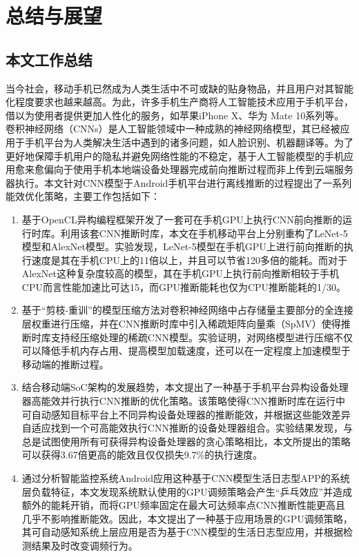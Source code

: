 \chapter{总结与展望}
\label{chapter:chapter6}
\section{本文工作总结}
当今社会，移动手机已然成为人类生活中不可或缺的贴身物品，并且用户对其智能化程度要求也越来越高。为此，许多手机生产商将人工智能技术应用于手机平台，借以为使用者提供更加人性化的服务，如苹果iPhone X、华为 Mate 10系列等。卷积神经网络（CNNs）是人工智能领域中一种成熟的神经网络模型，其已经被应用于手机平台为人类解决生活中遇到的诸多问题，如人脸识别、机器翻译等。为了更好地保障手机用户的隐私并避免网络性能的不稳定，基于人工智能模型的手机应用愈来愈偏向于使用手机本地端设备处理器完成前向推断过程而非上传到云端服务器执行。本文针对CNN模型于Android手机平台进行离线推断的过程提出了一系列能效优化策略，主要工作包括如下：
\begin{enumerate}
  \item 基于OpenCL异构编程框架开发了一套可在手机GPU上执行CNN前向推断的运行时库。利用该套CNN推断时库，本文在手机移动平台上分别重构了LeNet-5模型和AlexNet模型。实验发现，LeNet-5模型在手机GPU上进行前向推断的执行速度是其在手机CPU上的11倍以上，并且可以节省120多倍的能耗。而对于AlexNet这种复杂度较高的模型，其在手机GPU上执行前向推断相较于手机CPU而言性能加速比可达15，而GPU推断能耗也仅为CPU推断能耗的1/30。
  \item 基于“剪枝-重训”的模型压缩方法对卷积神经网络中占存储量主要部分的全连接层权重进行压缩，并在CNN推断时库中引入稀疏矩阵向量乘（SpMV）使得推断时库支持经压缩处理的稀疏CNN模型。实验证明，对网络模型进行压缩不仅可以降低手机内存占用、提高模型加载速度，还可以在一定程度上加速模型于移动端的推断过程。
  \item 结合移动端SoC架构的发展趋势，本文提出了一种基于手机平台异构设备处理器高能效并行执行CNN推断的优化策略。该策略使得CNN推断时库在运行中可自动感知目标平台上不同异构设备处理器的推断能效，并根据这些能效差异自适应找到一个可高能效执行CNN推断的设备处理器组合。实验结果发现，与总是试图使用所有可获得异构设备处理器的贪心策略相比，本文所提出的策略可以获得3.67倍更高的能效且仅仅损失9.7\%的执行速度。
  \item 通过分析智能监控系统Android应用这种基于CNN模型生活日志型APP的系统层负载特征，本文发现系统默认使用的GPU调频策略会产生“乒乓效应”并造成额外的能耗开销，而将GPU频率固定在最大可达频率点CNN推断性能更高且几乎不影响推断能效。因此，本文提出了一种基于应用场景的GPU调频策略，其可自动感知系统上层应用是否为基于CNN模型的生活日志型应用，并根据检测结果及时改变调频行为。
\end{enumerate}


